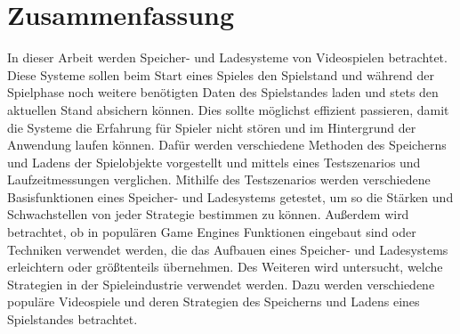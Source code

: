 \chapter*{Zusammenfassung}


In dieser Arbeit werden Speicher- und Ladesysteme von Videospielen betrachtet. Diese Systeme sollen beim Start eines Spieles den Spielstand und während der Spielphase noch weitere benötigten Daten des Spielstandes laden und stets den aktuellen Stand absichern können. Dies sollte möglichst effizient passieren, damit die Systeme die Erfahrung für Spieler nicht stören und im Hintergrund der Anwendung laufen können. Dafür werden verschiedene Methoden des Speicherns und Ladens der Spielobjekte vorgestellt und mittels eines Testszenarios und Laufzeitmessungen verglichen. Mithilfe des Testszenarios werden verschiedene Basisfunktionen eines Speicher- und Ladesystems getestet, um so die Stärken und Schwachstellen von jeder Strategie bestimmen zu können. Außerdem wird betrachtet, ob in populären Game Engines Funktionen eingebaut sind oder Techniken verwendet werden, die das Aufbauen eines Speicher- und Ladesystems erleichtern oder größtenteils übernehmen. Des Weiteren wird untersucht, welche Strategien in der Spieleindustrie verwendet werden. Dazu werden verschiedene populäre Videospiele und deren Strategien des Speicherns und Ladens eines Spielstandes betrachtet.
